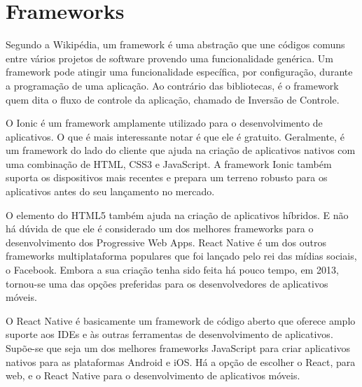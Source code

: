 \section{Frameworks}
\label{sec:frameworks}

Segundo a Wikipédia, um framework é uma abstração que une códigos comuns entre vários projetos de software provendo uma funcionalidade genérica. Um framework pode atingir uma funcionalidade específica, por configuração, durante a programação de uma aplicação. Ao contrário das bibliotecas, é o framework quem dita o fluxo de controle da aplicação, chamado de Inversão de Controle. \cite{framew}

O Ionic é um framework amplamente utilizado para o desenvolvimento de aplicativos. O que é mais interessante notar é que ele é gratuito. Geralmente, é um framework do lado do cliente que ajuda na criação de aplicativos nativos com uma combinação de HTML, CSS3 e JavaScript.
A framework Ionic também suporta os dispositivos mais recentes e prepara um terreno robusto para os aplicativos antes do seu lançamento no mercado.

O elemento do HTML5 também ajuda na criação de aplicativos híbridos. E não há dúvida de que ele é considerado um dos melhores frameworks para o desenvolvimento dos Progressive Web Apps.
React Native é um dos outros frameworks multiplataforma populares que foi lançado pelo rei das mídias sociais, o Facebook. Embora a sua criação tenha sido feita há pouco tempo, em 2013, tornou-se uma das opções preferidas para os desenvolvedores de aplicativos móveis.

O React Native é basicamente um framework de código aberto que oferece amplo suporte aos IDEs e às outras ferramentas de desenvolvimento de aplicativos. Supõe-se que seja um dos melhores frameworks JavaScript para criar aplicativos nativos para as plataformas Android e iOS. Há a opção de escolher o React, para web, e o React Native para o desenvolvimento de aplicativos móveis.
